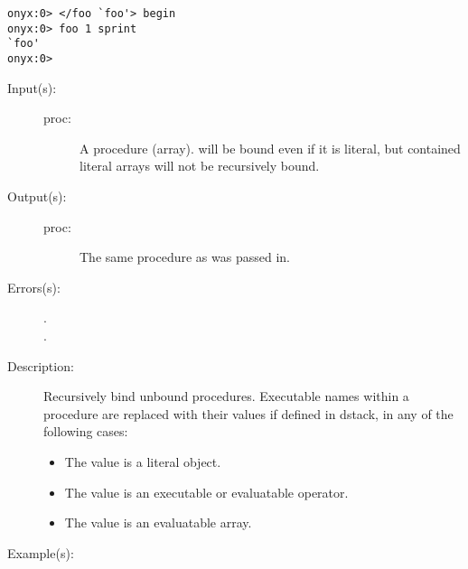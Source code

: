 \begin{description}
\begin{description}
\begin{verbatim}
onyx:0> </foo `foo'> begin
onyx:0> foo 1 sprint
`foo'
onyx:0>
		\end{verbatim}
	\end{description}
\label{systemdict:bind}
\item[{\onyxop{proc}{bind}{proc}}: ]
	\begin{description}\item[]
	\item[Input(s): ]
		\begin{description}\item[]
		\item[proc: ]
			A procedure (array).   will be bound even if
			it is literal, but contained literal arrays will not be
			recursively bound.
		\end{description}
	\item[Output(s): ]
		\begin{description}\item[]
		\item[proc: ]
			The same procedure as was passed in.
		\end{description}
	\item[Errors(s): ]
		\begin{description}\item[]
		\item[.]
		\item[.]
		\end{description}
	\item[Description: ]
		Recursively bind unbound procedures.  Executable names within a
		procedure are replaced with their values if defined in dstack,
		in any of the following cases:
		\begin{itemize}
		\item{The value is a literal object.}
		\item{The value is an executable or evaluatable operator.}
		\item{The value is an evaluatable array.}
		\end{itemize}
	\item[Example(s): ]\begin{verbatim}


\end{verbatim}
\end{description}
\end{description}
